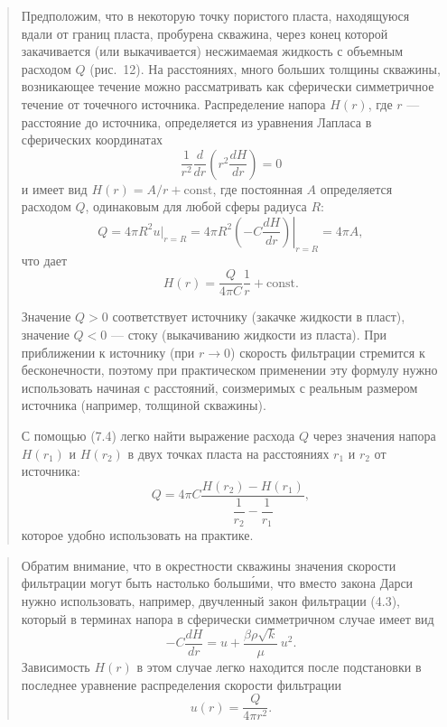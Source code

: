 \documentclass[12pt,a4paper]{article}
\newenvironment{textquote}{\begin{quote}\sloppy}{\end{quote}}
\begin{document}
\begin{textquote}
Предположим, что в некоторую точку пористого пласта, находящуюся вдали от границ пласта, пробурена скважина, через конец которой закачивается (или выкачивается) несжимаемая жидкость с объемным расходом $Q$ (рис.~12). На расстояниях, много больших толщины скважины, возникающее течение можно рассматривать как сферически симметричное течение от точечного источника. Распределение напора $H(r)$, где $r$ --- расстояние
до источника, определяется из уравнения Лапласа в сферических координатах
\[
\frac{1}{r^2}\frac{d}{dr}\left(r^2\frac{dH}{dr}\right)=0
\]
и имеет вид $H(r)=A/r+\mathrm{const}$, где постоянная $A$ определяется расходом $Q$, одинаковым для любой сферы радиуса $R$:
\[
Q=4\pi R^2\left.u\right|_{r=R}=\left.4\pi R^2\left(-C\frac{dH}{dr}\right)\right|_{r=R}=4\pi A,
\]
что дает
\begin{equation}
H(r)=\frac{Q}{4\pi C}\frac{1}{r}+\mathrm{const}.
\tag{7.4}\label{q4:eq-7-4}
\end{equation}

Значение $Q>0$ соответствует источнику (закачке жидкости в пласт), значение $Q<0$ --- стоку (выкачиванию жидкости из пласта). При приближении к источнику (при $r\to0$) скорость фильтрации стремится к бесконечности, поэтому при практическом применении эту формулу нужно использовать начиная с расстояний, соизмеримых с реальным размером источника (например, толщиной скважины).

С помощью (7.4) легко найти выражение расхода $Q$ через значения напора $H(r_1)$ и $H(r_2)$ в двух точках пласта на расстояниях $r_1$ и $r_2$ от источника:
\[
Q=4\pi C\frac{H(r_2)-H(r_1)}{\dfrac{1}{r_2}-\dfrac{1}{r_1}},
\]
которое удобно использовать на практике.
\end{textquote}

\begin{textquote}
Обратим внимание, что в окрестности скважины значения скорости фильтрации могут быть настолько больш\'ими, что вместо закона Дарси нужно использовать, например, двучленный закон фильтрации (4.3), который в терминах напора в сферически симметричном случае имеет вид
\[
-C\frac{dH}{dr}=u+\frac{\beta\rho\sqrt{k}}{\mu}\,u^2.
\]
Зависимость $H(r)$ в этом случае легко находится после подстановки в последнее уравнение распределения скорости фильтрации
\[
u(r)=\frac{Q}{4\pi r^2}.
\]
\end{textquote}
\end{document}
